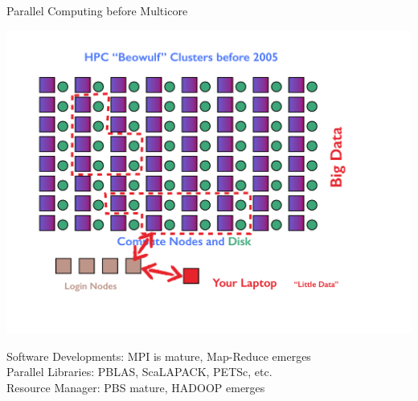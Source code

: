\begin{frame}{Parallel Computing before Multicore}
\begin{minipage}{8.0cm}
  \includegraphics[trim=3cm 0cm 0cm 0cm,clip=true,height=0.9\textheight]
  {../common/pics/hardware/ParallelHardware22.pdf}\hfill
\end{minipage}
\hspace{1ex}
\begin{minipage}{3.6cm}\small
  \begin{block}{Software Developments:}\pause
    \scriptsize MPI is mature, Map-Reduce emerges \\[1ex]
    Parallel Libraries: PBLAS, ScaLAPACK, PETSc, etc. \\[1ex]
    Resource Manager: PBS mature, HADOOP emerges
  \end{block}
\end{minipage}
\end{frame}


